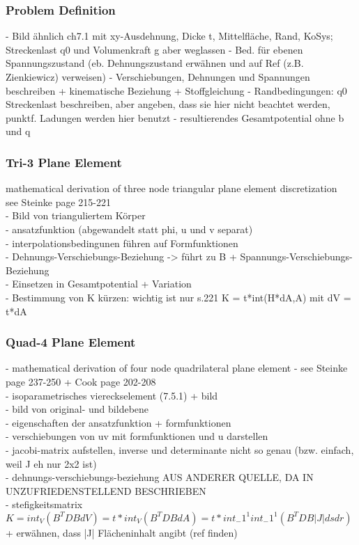 \documentclass[11pt,twoside]{scrartcl}
\begin{document}
  \subsubsection{Problem Definition}\label{sec:MprobDef}
  - Bild ähnlich ch7.1 mit xy-Ausdehnung, Dicke t, Mittelfläche, Rand, KoSys; Streckenlast q0 und Volumenkraft g aber weglassen\newline
  - Bed. für ebenen Spannungszustand (eb. Dehnungszustand erwähnen und auf Ref (z.B. Zienkiewicz) verweisen)\newline
  - Verschiebungen, Dehnungen und Spannungen beschreiben + kinematische Beziehung + Stoffgleichung\newline
  - Randbedingungen: q0 Streckenlast beschreiben, aber angeben, dass sie hier nicht beachtet werden, punktf. Ladungen werden hier benutzt\newline
  - resultierendes Gesamtpotential ohne b und q
  \subsubsection{Tri-3 Plane Element}
  mathematical derivation of three node triangular plane element discretization\\
  see Steinke \cite{steinke2005finite} page 215-221\\
  - Bild von trianguliertem Körper\\
  - ansatzfunktion (abgewandelt statt phi, u und v separat)\\
  - interpolationsbedingunen führen auf Formfunktionen\\
  - Dehnungs-Verschiebungs-Beziehung -> führt zu B + Spannungs-Verschiebungs-Beziehung\\
  - Einsetzen in Gesamtpotential + Variation\\
  - Bestimmung von K kürzen: wichtig ist nur s.221 K = t*int(H*dA,A) mit dV = t*dA
  \subsubsection{Quad-4 Plane Element}
  - mathematical derivation of four node quadrilateral plane element\newline
  - see Steinke \cite{steinke2005finite} page 237-250 + Cook \cite{cook2002concepts} page 202-208\\
  - isoparametrisches viereckselement (7.5.1) + bild\\
  - bild von original- und bildebene\\
  - eigenschaften der ansatzfunktion + formfunktionen\\
  - verschiebungen von uv mit formfunktionen und u darstellen\\
  - jacobi-matrix aufstellen, inverse und determinante nicht so genau (bzw. einfach, weil J eh nur 2x2 ist)\\
  - dehnungs-verschiebungs-beziehung AUS ANDERER QUELLE, DA IN \cite{steinke2005finite} UNZUFRIEDENSTELLEND BESCHRIEBEN\\
  - stefigkeitsmatrix $K = int_V(B^TDBdV) = t*int_V(B^TDBdA) = t*int_-1^1 int_-1^1(B^TDB|J|dsdr)$ + erwähnen, dass |J| Flächeninhalt angibt (ref finden)
\end{document}
